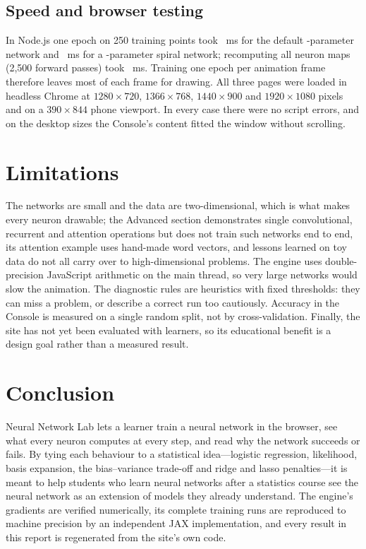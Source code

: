 \documentclass[11pt,a4paper]{article}
\begin{document}
\subsection{Speed and browser testing}
In Node.js one epoch on 250 training points took \msSmall{}~ms for the default \pSmall-parameter network and \msLarge{}~ms for a \pLarge-parameter spiral network; recomputing all neuron maps (2{,}500 forward passes) took \gridMs{}~ms. Training one epoch per animation frame therefore leaves most of each frame for drawing. All three pages were loaded in headless Chrome at $1280\times720$, $1366\times768$, $1440\times900$ and $1920\times1080$ pixels and on a $390\times844$ phone viewport. In every case there were no script errors, and on the desktop sizes the Console's content fitted the window without scrolling.

\section{Limitations}\label{sec:limits}

The networks are small and the data are two-dimensional, which is what makes every neuron drawable; the Advanced section demonstrates single convolutional, recurrent and attention operations but does not train such networks end to end, its attention example uses hand-made word vectors, and lessons learned on toy data do not all carry over to high-dimensional problems. The engine uses double-precision JavaScript arithmetic on the main thread, so very large networks would slow the animation. The diagnostic rules are heuristics with fixed thresholds: they can miss a problem, or describe a correct run too cautiously. Accuracy in the Console is measured on a single random split, not by cross-validation. Finally, the site has not yet been evaluated with learners, so its educational benefit is a design goal rather than a measured result.

\section{Conclusion}

Neural Network Lab lets a learner train a neural network in the browser, see what every neuron computes at every step, and read why the network succeeds or fails. By tying each behaviour to a statistical idea---logistic regression, likelihood, basis expansion, the bias--variance trade-off and ridge and lasso penalties---it is meant to help students who learn neural networks after a statistics course see the neural network as an extension of models they already understand. The engine's gradients are verified numerically, its complete training runs are reproduced to machine precision by an independent JAX implementation, and every result in this report is regenerated from the site's own code.
\end{document}
